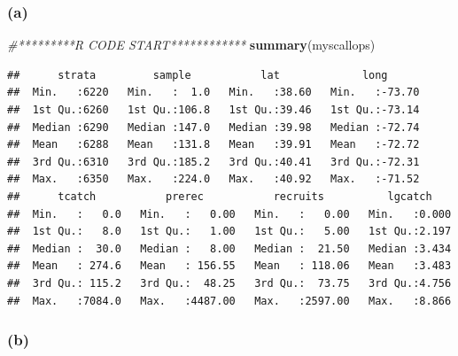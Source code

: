 \documentclass[]{article}
\newenvironment{Shaded}{\begin{snugshade}}{\end{snugshade}}
\newcommand{\KeywordTok}[1]{\textcolor[rgb]{0.13,0.29,0.53}{\textbf{#1}}}
\newcommand{\DataTypeTok}[1]{\textcolor[rgb]{0.13,0.29,0.53}{#1}}
\newcommand{\DecValTok}[1]{\textcolor[rgb]{0.00,0.00,0.81}{#1}}
\newcommand{\FloatTok}[1]{\textcolor[rgb]{0.00,0.00,0.81}{#1}}
\newcommand{\StringTok}[1]{\textcolor[rgb]{0.31,0.60,0.02}{#1}}
\newcommand{\CommentTok}[1]{\textcolor[rgb]{0.56,0.35,0.01}{\textit{#1}}}
\newcommand{\OperatorTok}[1]{\textcolor[rgb]{0.81,0.36,0.00}{\textbf{#1}}}
\newcommand{\NormalTok}[1]{#1}
\begin{document}
\subsubsection{(a)}\label{a}

\begin{Shaded}
\begin{Highlighting}[]
\CommentTok{#*********R CODE START************}
\KeywordTok{summary}\NormalTok{(myscallops)}
\end{Highlighting}
\end{Shaded}

\begin{verbatim}
##      strata         sample           lat             long       
##  Min.   :6220   Min.   :  1.0   Min.   :38.60   Min.   :-73.70  
##  1st Qu.:6260   1st Qu.:106.8   1st Qu.:39.46   1st Qu.:-73.14  
##  Median :6290   Median :147.0   Median :39.98   Median :-72.74  
##  Mean   :6288   Mean   :131.8   Mean   :39.91   Mean   :-72.72  
##  3rd Qu.:6310   3rd Qu.:185.2   3rd Qu.:40.41   3rd Qu.:-72.31  
##  Max.   :6350   Max.   :224.0   Max.   :40.92   Max.   :-71.52  
##      tcatch           prerec           recruits          lgcatch     
##  Min.   :   0.0   Min.   :   0.00   Min.   :   0.00   Min.   :0.000  
##  1st Qu.:   8.0   1st Qu.:   1.00   1st Qu.:   5.00   1st Qu.:2.197  
##  Median :  30.0   Median :   8.00   Median :  21.50   Median :3.434  
##  Mean   : 274.6   Mean   : 156.55   Mean   : 118.06   Mean   :3.483  
##  3rd Qu.: 115.2   3rd Qu.:  48.25   3rd Qu.:  73.75   3rd Qu.:4.756  
##  Max.   :7084.0   Max.   :4487.00   Max.   :2597.00   Max.   :8.866
\end{verbatim}

\subsubsection{(b)}\label{b}

\begin{Shaded}
\end{Shaded}
\end{document}
